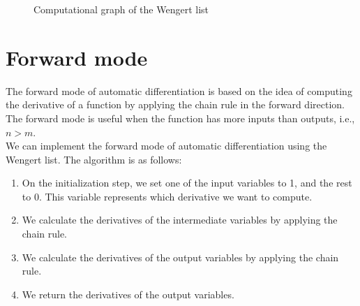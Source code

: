 \begin{figure}[H]
    \centering
    \label{fig:my_label}
    \caption{Computational graph of the Wengert list}
\end{figure}

\section{Forward mode}

The forward mode of automatic differentiation is based on the idea of computing the derivative
of a function by applying the chain rule in the forward direction. The forward mode is useful
when the function has more inputs than outputs, i.e., $n > m$.\\

We can implement the forward mode of automatic differentiation using the Wengert list. 
The algorithm is as follows:

\begin{enumerate}
    \item On the initialization step, we set one of the input variables to 1, and the rest to 0.
    This variable represents which derivative we want to compute.

    \item We calculate the derivatives of the intermediate variables by applying the chain rule.
    
    \item We calculate the derivatives of the output variables by applying the chain rule.
    
    \item We return the derivatives of the output variables.
\end{enumerate}

